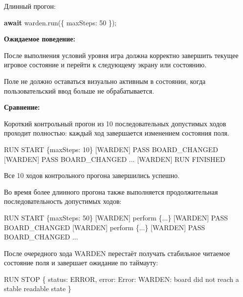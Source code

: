\documentclass{ZGJournalArticle_2026}
\newenvironment{Shaded}{}{}
\newcommand{\ControlFlowTok}[1]{\textcolor[rgb]{0.00,0.44,0.13}{\textbf{#1}}}
\newcommand{\DataTypeTok}[1]{\textcolor[rgb]{0.56,0.13,0.00}{#1}}
\newcommand{\DecValTok}[1]{\textcolor[rgb]{0.25,0.63,0.44}{#1}}
\newcommand{\FunctionTok}[1]{\textcolor[rgb]{0.02,0.16,0.49}{#1}}
\newcommand{\NormalTok}[1]{#1}
\newcommand{\OperatorTok}[1]{\textcolor[rgb]{0.40,0.40,0.40}{#1}}
\begin{document}
Длинный прогон:

\begin{Shaded}
\begin{Highlighting}[]
\ControlFlowTok{await}\NormalTok{ warden}\OperatorTok{.}\FunctionTok{run}\NormalTok{(\{ }\DataTypeTok{maxSteps}\OperatorTok{:} \DecValTok{50}\NormalTok{ \})}\OperatorTok{;}
\end{Highlighting}
\end{Shaded}

\textbf{Ожидаемое поведение:}

После выполнения условий уровня игра должна корректно завершить текущее
игровое состояние и перейти к следующему экрану или состоянию.

Поле не должно оставаться визуально активным в состоянии, когда
пользовательский ввод больше не обрабатывается.

\textbf{Сравнение:}

Короткий контрольный прогон из 10 последовательных допустимых ходов
проходит полностью: каждый ход завершается изменением состояния поля.

\begin{Shaded}
\begin{Highlighting}[]
\NormalTok{[WARDEN] RUN START \{maxSteps: 10\}}
\NormalTok{[WARDEN] PASS BOARD\_CHANGED}
\NormalTok{[WARDEN] PASS BOARD\_CHANGED}
\NormalTok{...}
\NormalTok{[WARDEN] RUN FINISHED}
\end{Highlighting}
\end{Shaded}

Все 10 ходов контрольного прогона завершились успешно.

\newpage

Во время более длинного прогона также выполняется продолжительная
последовательность допустимых ходов:

\begin{Shaded}
\begin{Highlighting}[]
\NormalTok{[WARDEN] RUN START \{maxSteps: 50\}}
\NormalTok{[WARDEN] perform \{...\}}
\NormalTok{[WARDEN] PASS BOARD\_CHANGED}
\NormalTok{[WARDEN] perform \{...\}}
\NormalTok{[WARDEN] PASS BOARD\_CHANGED}
\NormalTok{...}
\end{Highlighting}
\end{Shaded}

После очередного хода WARDEN перестаёт получать стабильное читаемое
состояние поля и завершает ожидание по таймауту:

\begin{Shaded}
\begin{Highlighting}[]
\NormalTok{[WARDEN] RUN STOP \{}
\NormalTok{  status: \textquotesingle{}ERROR\textquotesingle{},}
\NormalTok{  error: \textquotesingle{}Error: WARDEN: board did not reach a stable readable state\textquotesingle{}}
\NormalTok{\}}
\end{Highlighting}
\end{Shaded}
\end{document}
